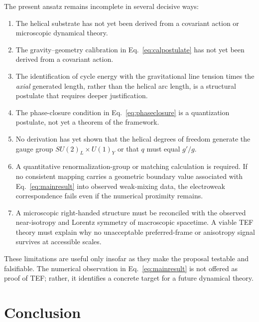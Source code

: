 \documentclass[aps,prd,reprint,nofootinbib,floatfix]{revtex4-2}
\begin{document}
The present ansatz remains incomplete in several decisive ways:
\begin{enumerate}[leftmargin=*,label=(\roman*)]
\item The helical substrate has not yet been derived from a covariant action or microscopic dynamical theory.
\item The gravity--geometry calibration in Eq.~\eqref{eq:calpostulate} has not yet been derived from a covariant action.
\item The identification of cycle energy with the gravitational line tension times the \emph{axial} generated length, rather than the helical arc length, is a structural postulate that requires deeper justification.
\item The phase-closure condition in Eq.~\eqref{eq:phaseclosure} is a quantization postulate, not yet a theorem of the framework.
\item No derivation has yet shown that the helical degrees of freedom generate the gauge group $SU(2)_L\times U(1)_Y$ or that $q$ must equal $g'/g$.
\item A quantitative renormalization-group or matching calculation is required.  If no consistent mapping carries a geometric boundary value associated with Eq.~\eqref{eq:mainresult} into observed weak-mixing data, the electroweak correspondence fails even if the numerical proximity remains.
\item A microscopic right-handed structure must be reconciled with the observed near-isotropy and Lorentz symmetry of macroscopic spacetime.  A viable TEF theory must explain why no unacceptable preferred-frame or anisotropy signal survives at accessible scales.
\end{enumerate}

These limitations are useful only insofar as they make the proposal testable and falsifiable.  The numerical observation in Eq.~\eqref{eq:mainresult} is not offered as proof of TEF; rather, it identifies a concrete target for a future dynamical theory.

\section{Conclusion}
\end{document}
